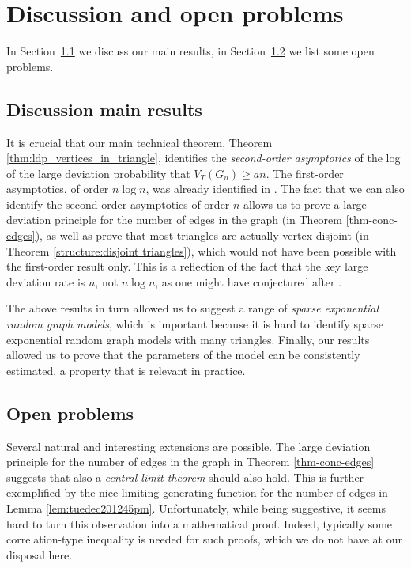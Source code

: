 \documentclass[bj,authoryear,noshowframe]{imsart}
\numberwithin{equation}{section}
\theoremstyle{plain}
\theoremstyle{definition}
\begin{document}

\section{Discussion and open problems}
\label{sec-disc}

In Section~\ref{sec:disc} we discuss our main results, in Section~\ref{sec:prob} we list some open problems.
\medskip 


\subsection{Discussion main results}
\label{sec:disc}
 
It is crucial that our main technical theorem, Theorem \ref{thm:ldp_vertices_in_triangle}, identifies the {\em second-order asymptotics} of the log of the large deviation probability that $V_T(G_n)\geq an$. The first-order asymptotics, of order $n\log n $, was already identified in \cite{ChaHofHol21}. The fact that we can also identify the second-order asymptotics of order $n$ allows us to prove a large deviation principle for the number of edges in the graph (in Theorem \ref{thm-conc-edges}), as well as prove that most triangles are actually vertex disjoint (in Theorem \ref{structure:disjoint triangles}), which would not have been possible with the first-order result only. This is a reflection of the fact that the key large deviation rate is $n$, not $n\log n$, as one might have conjectured after \cite{ChaHofHol21}. 

The above results in turn allowed us to suggest a range of {\em sparse exponential random graph models}, which is important because it is hard to identify sparse exponential random graph models with many triangles. Finally, our results allowed us to prove that the parameters of the model can be consistently estimated, a property that is relevant in practice.


\subsection{Open problems}
\label{sec:prob}
 
Several natural and interesting extensions are possible. The large deviation principle for the number of edges in the graph in Theorem \ref{thm-conc-edges} suggests that also a {\em central limit theorem} should also hold. This is further exemplified by the nice limiting generating function for the number of edges in Lemma \ref{lem:tuedec201245pm}. Unfortunately, while being suggestive, it seems hard to turn this observation into a mathematical proof. Indeed, typically some correlation-type inequality is needed for such proofs, which we do not have at our disposal here.
 
\end{document}
